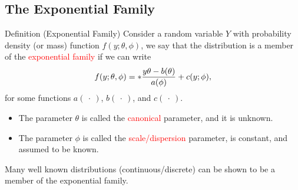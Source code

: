 \documentclass[oneside]{book}\usepackage[]{graphicx}\usepackage[svgnames]{xcolor}
\let\exp\relax%
\begin{document}
\subsection*{The Exponential Family}
\begin{Regular}{Definition (Exponential Family)}
      Consider a random variable $ Y $ with probability density (or mass) function $ f(y;\theta,\phi) $,
      we say that the distribution is a member of the \textcolor{Red}{exponential family} if we can write
      \[ f(y;\theta,\phi)=\exp*{\frac{y\theta-b(\theta)}{a(\phi)}+c(y;\phi)}, \]
      for some functions $ a(\:\cdot\:) $, $ b(\:\cdot\:) $, and $ c(\:\cdot\:) $.
      \begin{itemize}
            \item The parameter $ \theta $ is called the \textcolor{Red}{canonical} parameter, and it is unknown.
            \item The parameter $ \phi $ is called the \textcolor{Red}{scale/dispersion} parameter, is constant, and assumed to be known.
      \end{itemize}
\end{Regular}
Many well known distributions (continuous/discrete) can be shown to be a
member of the exponential family.
\end{document}
